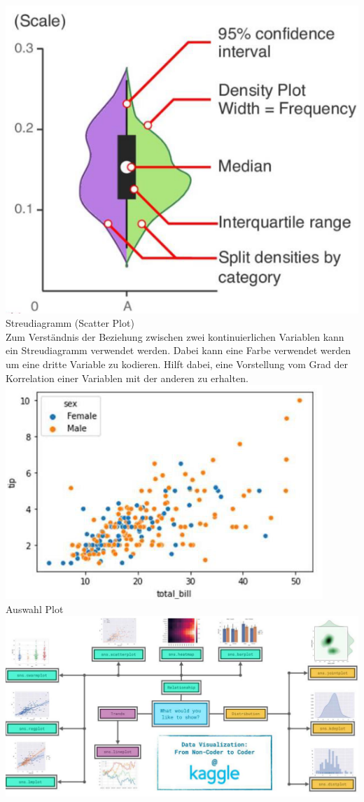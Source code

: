 \includegraphics[width=0.9\linewidth]{img/violinplot.png}
\textcolor{myblue}{Streudiagramm (Scatter Plot)}\\
Zum Verständnis der Beziehung zwischen zwei kontinuierlichen Variablen kann ein Streudiagramm verwendet werden. Dabei kann eine Farbe verwendet werden um eine dritte Variable zu kodieren. Hilft dabei, eine Vorstellung vom Grad der Korrelation einer Variablen mit der anderen zu erhalten.
\includegraphics[width=\linewidth]{img/scatterplot.png}
\textcolor{myblue}{Auswahl Plot}\\
\includegraphics[width=\linewidth]{img/which_plot.png}